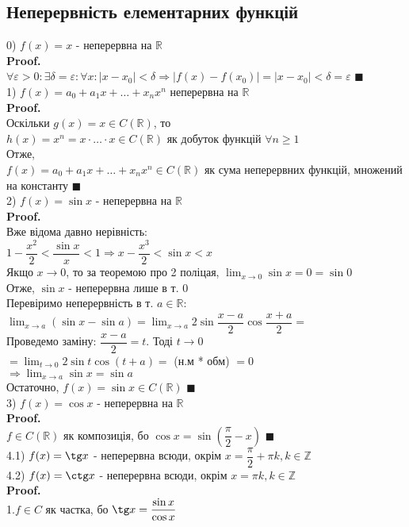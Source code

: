 \documentclass[a4paper, 14pt]{extarticle}
\def\huge{\displaystyle}
\def\bigline{\vspace{5mm}\\}
\def\proof{\textbf{Proof.}\\}
\def\bigline{\vspace{5mm}\\}
\def\qed{$\blacksquare$}
\begin{document}
\subsection{Неперервність елементарних функцій}
0) $f(x) = x$ - неперервна на $\mathbb{R}$\\
\proof
$\forall \varepsilon > 0: \exists \delta = \varepsilon: \forall x: |x-x_0|<\delta \Rightarrow |f(x)-f(x_0)| = |x-x_0|<\delta = \varepsilon$ \qed
\bigline
1) $f(x) = a_0 + a_1 x + \dots + x_n x^n$ неперервна на $\mathbb{R}$\\
\proof
Оскільки $g(x) = x \in C(\mathbb{R})$, то \\ $h(x)=x^n = x \cdot \dots \cdot x \in C(\mathbb{R})$ як добуток функцій $\forall n \geq 1$\\
Отже,\\
$f(x) = a_0 + a_1 x + \dots + x_n x^n \in C(\mathbb{R})$ як сума неперервних функцій, множений на константу \qed
\bigline
2) $f(x) = \sin x$ - неперервна на $\mathbb{R}$\\
\proof
Вже відома давно нерівність:\\
$1 - \dfrac{x^2}{2} < \dfrac{\sin x}{x} < 1 \Rightarrow x - \dfrac{x^3}{2} < \sin x < x$\\
Якщо $x \to 0$, то за теоремою про 2 поліцая, $\huge \lim_{x \to 0} \sin x = 0 = \sin 0$\\
Отже, $\sin x$ - неперервна лише в т. $0$\\
Перевіримо неперервність в т. $a \in \mathbb{R}$:\\
$\huge \lim_{x \to a} (\sin x - \sin a) = \lim_{x \to a} 2 \sin \dfrac{x-a}{2} \cos \dfrac{x+a}{2} = $\\
Проведемо заміну: $\dfrac{x-a}{2} = t$. Тоді $t \to 0$\\
$= \huge \lim_{t \to 0} 2 \sin t \cos (t+a) =$ (н.м * обм) $= 0$\\
$\Rightarrow \huge \lim_{x \to a} \sin x = \sin a$\\
Остаточно, $f(x) = \sin x \in C(\mathbb{R})$ \qed
\bigline
3) $f(x) = \cos x$ - неперервна на $\mathbb{R}$\\
\proof
$f \in C(\mathbb{R})$ як композиція, бо $\cos x = \sin\left(\dfrac{\pi}{2} -x \right)$ \qed
\bigline
4.1) $f(x) = \tg x$ - неперервна всюди, окрім $x = \dfrac{\pi}{2} + \pi k, k \in \mathbb{Z}$\\
4.2) $f(x) = \ctg x$ - неперервна всюди, окрім $x = \pi k, k \in \mathbb{Z}$\\
\proof
1.$f \in C$ як частка, бо $\tg x = \dfrac{\sin x}{\cos x}$\\
\end{document}

